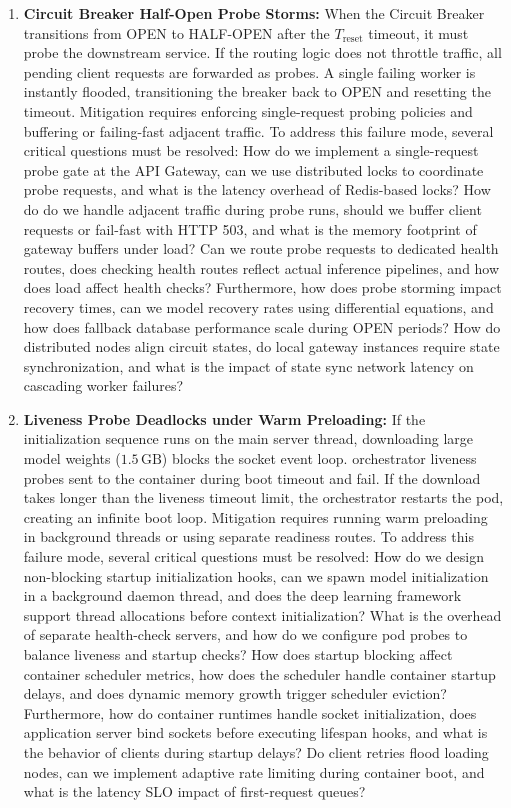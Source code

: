 \documentclass[11pt,a4paper]{article}
\theoremstyle{plain}
\theoremstyle{definition}
\theoremstyle{remark}
\begin{document}
\begin{enumerate}[label=\textbf{CF\arabic*.}]
    \item \textbf{Circuit Breaker Half-Open Probe Storms:} 
    When the Circuit Breaker transitions from OPEN to HALF-OPEN after the $T_{\text{reset}}$ timeout, it must probe the downstream service. If the routing logic does not throttle traffic, all pending client requests are forwarded as probes. A single failing worker is instantly flooded, transitioning the breaker back to OPEN and resetting the timeout.
    Mitigation requires enforcing single-request probing policies and buffering or failing-fast adjacent traffic.
    To address this failure mode, several critical questions must be resolved: How do we implement a single-request probe gate at the API Gateway, can we use distributed locks to coordinate probe requests, and what is the latency overhead of Redis-based locks? How do do we handle adjacent traffic during probe runs, should we buffer client requests or fail-fast with HTTP 503, and what is the memory footprint of gateway buffers under load? Can we route probe requests to dedicated health routes, does checking health routes reflect actual inference pipelines, and how does load affect health checks? Furthermore, how does probe storming impact recovery times, can we model recovery rates using differential equations, and how does fallback database performance scale during OPEN periods? How do distributed nodes align circuit states, do local gateway instances require state synchronization, and what is the impact of state sync network latency on cascading worker failures?

    \item \textbf{Liveness Probe Deadlocks under Warm Preloading:} 
    If the initialization sequence runs on the main server thread, downloading large model weights ($1.5\,\mathrm{GB}$) blocks the socket event loop. orchestrator liveness probes sent to the container during boot timeout and fail. If the download takes longer than the liveness timeout limit, the orchestrator restarts the pod, creating an infinite boot loop.
    Mitigation requires running warm preloading in background threads or using separate readiness routes.
    To address this failure mode, several critical questions must be resolved: How do we design non-blocking startup initialization hooks, can we spawn model initialization in a background daemon thread, and does the deep learning framework support thread allocations before context initialization? What is the overhead of separate health-check servers, and how do we configure pod probes to balance liveness and startup checks? How does startup blocking affect container scheduler metrics, how does the scheduler handle container startup delays, and does dynamic memory growth trigger scheduler eviction? Furthermore, how do container runtimes handle socket initialization, does application server bind sockets before executing lifespan hooks, and what is the behavior of clients during startup delays? Do client retries flood loading nodes, can we implement adaptive rate limiting during container boot, and what is the latency SLO impact of first-request queues?


\end{enumerate}
\end{document}
